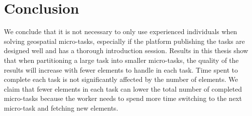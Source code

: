 \chapter{Conclusion}

We conclude that it is not necessary to only use experienced individuals when solving geospatial micro-tasks, especially if the platform publishing the tasks are designed well and has a thorough introduction session. 
Results in this thesis show that when partitioning a large task into smaller micro-tasks, the quality of the results will increase with fewer elements to handle in each task. Time spent to complete each task is not significantly affected by the number of elements.
We claim that fewer elements in each task can lower the total number of completed micro-tasks because the worker needs to spend more time switching to the next micro-task and fetching new elements. 
